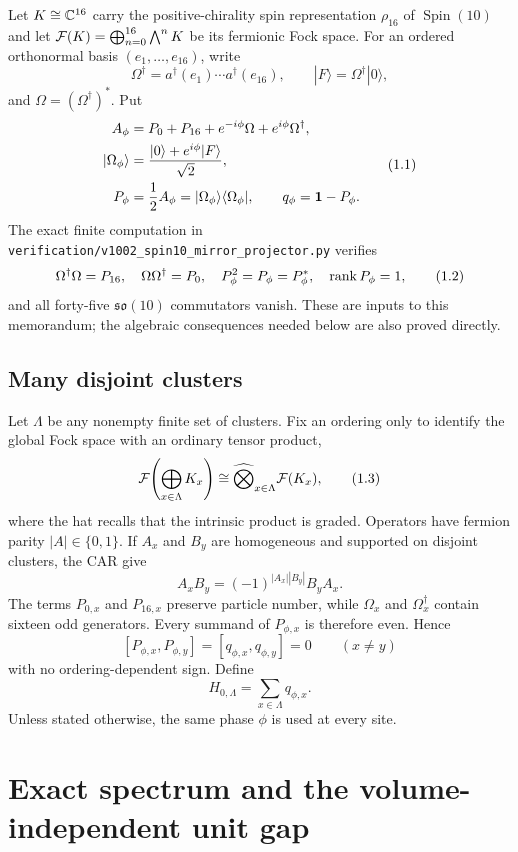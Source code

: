Let $K\cong\mathbb C^{16}$ carry the positive-chirality spin representation
$\rho_{16}$ of $\operatorname{Spin}(10)$ and let
$\mathcal F(K)=\bigoplus_{n=0}^{16}\bigwedge^nK$ be its fermionic Fock space.
For an ordered orthonormal basis $(e_1,\ldots,e_{16})$, write
\[
 \Omega^\dagger
 =a^\dagger(e_1)\cdots a^\dagger(e_{16}),\qquad
 |F\rangle=\Omega^\dagger|0\rangle ,
\]
and $\Omega=(\Omega^\dagger)^*$.  Put
\[
\begin{aligned}
 A_\phi
 &=P_0+P_{16}+e^{-i\phi}\Omega+e^{i\phi}\Omega^\dagger,\\
 |\Omega_\phi\rangle
 &=\frac{|0\rangle+e^{i\phi}|F\rangle}{\sqrt2},\\
 P_\phi&=\frac12A_\phi
 =|\Omega_\phi\rangle\langle\Omega_\phi|,\qquad
 q_\phi=\mathbf 1-P_\phi.
\end{aligned}
\tag{1.1}\label{eq:cluster}
\]
The exact finite computation in
\texttt{verification/v1002\_spin10\_mirror\_projector.py} verifies
\[
 \Omega^\dagger\Omega=P_{16},\quad
 \Omega\Omega^\dagger=P_0,\quad
 P_\phi^2=P_\phi=P_\phi^*,\quad
 \operatorname{rank} P_\phi=1,
\tag{1.2}\label{eq:frozen}
\]
and all forty-five $\mathfrak{so}(10)$ commutators vanish.  These are
inputs to this memorandum; the algebraic consequences needed below
are also proved directly.

\subsection{Many disjoint clusters}

Let $\Lambda$ be any nonempty finite set of clusters.  Fix an ordering
only to identify the global Fock space with an ordinary tensor product,
\[
 \mathcal F\!\left(\bigoplus_{x\in\Lambda}K_x\right)
 \cong\widehat{\bigotimes}_{x\in\Lambda}\mathcal F(K_x),
\tag{1.3}\label{eq:gradedtensor}
\]
where the hat recalls that the intrinsic product is graded.  Operators
have fermion parity $|A|\in\{0,1\}$.  If $A_x$ and $B_y$ are homogeneous
and supported on disjoint clusters, the CAR give
\[
 A_xB_y=(-1)^{|A_x||B_y|}B_yA_x.
\tag{1.4}\label{eq:gradedcommute}
\]
The terms $P_{0,x}$ and $P_{16,x}$ preserve particle number, while
$\Omega_x$ and $\Omega_x^\dagger$ contain sixteen odd generators.
Every summand of $P_{\phi,x}$ is therefore even.  Hence
\[
 [P_{\phi,x},P_{\phi,y}]=[q_{\phi,x},q_{\phi,y}]=0
 \qquad(x\ne y)
\tag{1.5}\label{eq:commute}
\]
with no ordering-dependent sign.  Define
\[
 H_{0,\Lambda}=\sum_{x\in\Lambda}q_{\phi,x}.
\tag{1.6}\label{eq:H0}
\]
Unless stated otherwise, the same phase $\phi$ is used at every site.

\section{Exact spectrum and the volume-independent unit gap}

